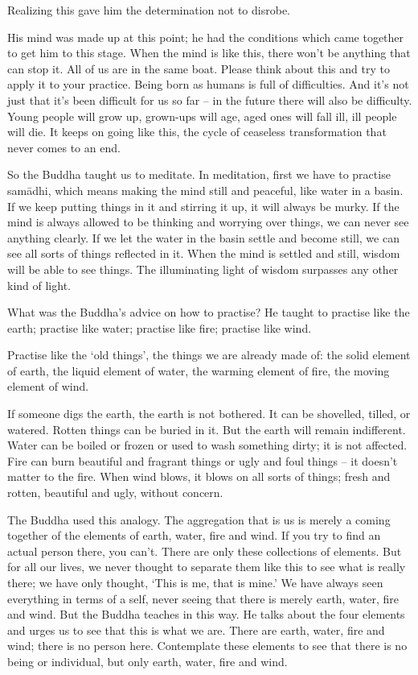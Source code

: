 Realizing this gave him the determination not to disrobe. 

His mind was made up at this point; he had the conditions which came together to get him to this stage. When the mind is like this, there won't be anything that can stop it. All of us are in the same boat. Please think about this and try to apply it to your practice. Being born as humans is full of difficulties. And it's not just that it's been difficult for us so far -- in the future there will also be difficulty. Young people will grow up, grown-ups will age, aged ones will fall ill, ill people will die. It keeps on going like this, the cycle of ceaseless transformation that never comes to an end. 

So the Buddha taught us to meditate. In meditation, first we have to practise sam\=adhi, which means making the mind still and peaceful, like water in a basin. If we keep putting things in it and stirring it up, it will always be murky. If the mind is always allowed to be thinking and worrying over things, we can never see anything clearly. If we let the water in the basin settle and become still, we can see all sorts of things reflected in it. When the mind is settled and still, wisdom will be able to see things. The illuminating light of wisdom surpasses any other kind of light. 

What was the Buddha's advice on how to practise? He taught to practise like the earth; practise like water; practise like fire; practise like wind. 

Practise like the `old things', the things we are already made of: the solid element of earth, the liquid element of water, the warming element of fire, the moving element of wind. 

If someone digs the earth, the earth is not bothered. It can be shovelled, tilled, or watered. Rotten things can be buried in it. But the earth will remain indifferent. Water can be boiled or frozen or used to wash something dirty; it is not affected. Fire can burn beautiful and fragrant things or ugly and foul things -- it doesn't matter to the fire. When wind blows, it blows on all sorts of things; fresh and rotten, beautiful and ugly, without concern. 

The Buddha used this analogy. The aggregation that is us is merely a coming together of the elements of earth, water, fire and wind. If you try to find an actual person there, you can't. There are only these collections of elements. But for all our lives, we never thought to separate them like this to see what is really there; we have only thought, `This is me, that is mine.' We have always seen everything in terms of a self, never seeing that there is merely earth, water, fire and wind. But the Buddha teaches in this way. He talks about the four elements and urges us to see that this is what we are. There are earth, water, fire and wind; there is no person here. Contemplate these elements to see that there is no being or individual, but only earth, water, fire and wind. 

